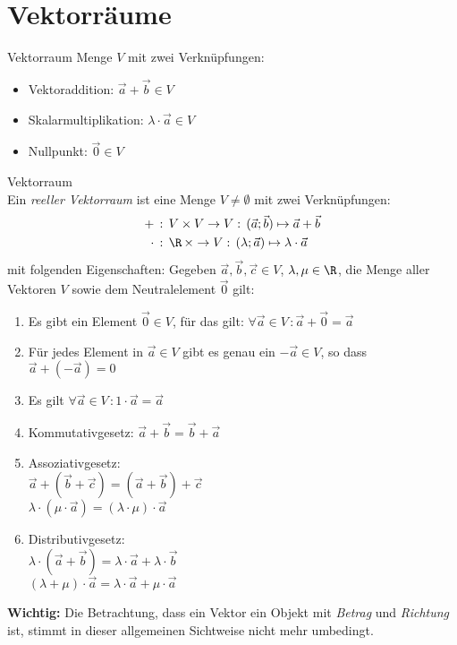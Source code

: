 \graphicspath{{images/}}

\section{Vektorräume}

\begin{definition}{Vektorraum}
    Menge $V$ mit zwei Verknüpfungen:
    \begin{itemize}
        \item Vektoraddition: $\overrightarrow{a} + \overrightarrow{b} \in V$
        \item Skalarmultiplikation: $\lambda \cdot \overrightarrow{a} \in V$
        \item Nullpunkt: $\overrightarrow{0} \in V$
    \end{itemize}
\end{definition}


    \begin{definition}{Vektorraum}\\
        Ein \textit{reeller Vektorraum} ist eine Menge $V\neq\emptyset$ mit zwei Verknüpfungen:
        \begin{align*}
            +\,&:\,V\times V\rightarrow V:\,(\vec{a};\vec{b})\mapsto\vec{a}+\vec{b}\\
            \cdot\,&:\,\R\,\times\rightarrow V:\,(\lambda;\vec{a})\mapsto\lambda\cdot\vec{a}
        \end{align*}
        mit folgenden Eigenschaften:
        Gegeben $\vec{a},\vec{b},\vec{c}\in V$, $\lambda,\mu\in \R$, die Menge aller Vektoren $V$ 
        sowie dem Neutralelement $\vec{0}$ gilt:
        \begin{enumerate}
            \item Es gibt ein Element $\vec{0}\in V$, für das gilt: $\forall \vec{a}\in V\,:\vec{a}+\vec{0}=\vec{a}$
            \item Für jedes Element in $\vec{a}\in V$ gibt es genau ein $-\vec{a}\in V$, so dass $\vec{a}+(-\vec{a})=0$
            \item Es gilt $\forall \vec{a}\in V\,:1\cdot\vec{a}=\vec{a}$
            \item Kommutativgesetz: $\vec{a}+\vec{b}=\vec{b}+\vec{a}$
            \item Assoziativgesetz: \\
                $\vec{a}+(\vec{b}+\vec{c})=(\vec{a}+\vec{b})+\vec{c}$\\
                $\lambda\cdot(\mu\cdot\vec{a})=(\lambda\cdot\mu)\cdot\vec{a}$
            \item Distributivgesetz: \\
                $\lambda\cdot(\vec{a}+\vec{b})=\lambda\cdot\vec{a}+\lambda\cdot\vec{b}$\\
                $(\lambda+\mu)\cdot\vec{a}=\lambda\cdot\vec{a}+\mu\cdot\vec{a}$
        \end{enumerate}
        \textbf{Wichtig:} Die Betrachtung, dass ein Vektor ein Objekt mit \textit{Betrag} und \textit{Richtung} ist,
        stimmt in dieser allgemeinen Sichtweise nicht mehr umbedingt.
    \end{definition}

